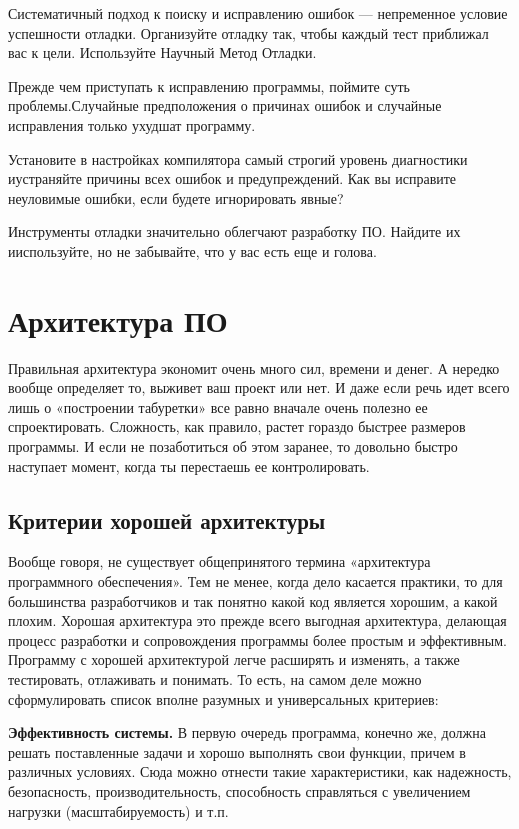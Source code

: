 \documentclass[a4paper]{article}
\begin{document}
Систематичный  подход  к  поиску  и  исправлению  ошибок  —  непременное  условие  успешности  отладки.  Организуйте  отладку  так,  чтобы  каждый  тест  приближал  вас  к  цели.  Используйте  Научный  Метод  Отладки.

Прежде  чем  приступать  к  исправлению  программы,  поймите  суть  проблемы.Случайные предположения о причинах ошибок и случайные исправления только  ухудшат  программу.

Установите  в  настройках  компилятора  самый  строгий  уровень  диагностики  иустраняйте причины всех ошибок и предупреждений. Как вы исправите неуловимые  ошибки,  если  будете  игнорировать  явные?

Инструменты  отладки  значительно  облегчают  разработку  ПО.  Найдите  их  ииспользуйте,  но  не  забывайте,  что  у  вас  есть  еще  и  голова.

\section{Архитектура ПО}

Правильная архитектура экономит очень много сил, времени и денег. А нередко вообще определяет то, выживет ваш проект или нет. И даже если речь идет всего лишь о «построении табуретки» все равно вначале очень полезно ее спроектировать. Сложность, как правило, растет гораздо быстрее размеров программы. И если не позаботиться об этом заранее, то довольно быстро наступает момент, когда ты перестаешь ее контролировать.

\subsection{Критерии хорошей архитектуры}

Вообще говоря, не существует общепринятого термина «архитектура программного обеспечения». Тем не менее, когда дело касается практики, то для большинства разработчиков и так понятно какой код является хорошим, а какой плохим. Хорошая архитектура это прежде всего выгодная архитектура, делающая процесс разработки и сопровождения программы более простым и эффективным. Программу с хорошей архитектурой легче расширять и изменять, а также тестировать, отлаживать и понимать. То есть, на самом деле можно сформулировать список вполне разумных и универсальных критериев:

\noindent\textbf{Эффективность системы.} В первую очередь программа, конечно же, должна решать поставленные задачи и хорошо выполнять свои функции, причем в различных условиях. Сюда можно отнести такие характеристики, как надежность, безопасность, производительность, способность справляться с увеличением нагрузки (масштабируемость) и т.п.
\end{document}
